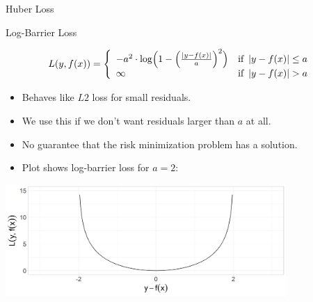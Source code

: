 \begin{vbframe}{Huber Loss}


\end{vbframe}



\begin{vbframe}{Log-Barrier Loss}

\begin{small}
\[
  L(y, f(x)) = \left\{\begin{array}{lr}
        -a^{2} \cdot \log \Bigl( 1 - \Bigl(\frac{\left|y - f(x)\right|}{a}\Bigr)^2 \Bigr) & \text{if } \left|y-f(x)\right| \leq a \\
        \infty & \text{if } \left|y-f(x)\right|  > a
        \end{array}\right.
  \]
\end{small}

\begin{itemize}
\item Behaves like $L2$ loss for small residuals.
\item We use this if we don't want residuals larger than $a$ at all.
\item No guarantee that the risk minimization problem has a solution.
\item Plot shows log-barrier loss for $a=2$:
\end{itemize}

\begin{center}
\includegraphics[width = 0.8\textwidth]{figure/loss_logbarrier_1.png}
\end{center}


\end{vbframe}




